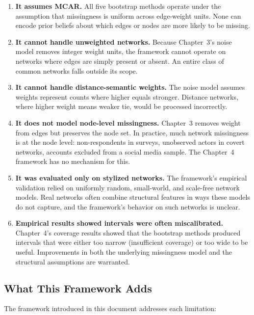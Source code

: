 \documentclass[11pt]{article}
\begin{document}
\begin{enumerate}[leftmargin=*, itemsep=2pt]
  \item \textbf{It assumes MCAR.} All five bootstrap methods operate under the assumption that missingness is uniform across edge-weight units. None can encode prior beliefs about which edges or nodes are more likely to be missing.

  \item \textbf{It cannot handle unweighted networks.} Because Chapter~3's noise model removes integer weight units, the framework cannot operate on networks where edges are simply present or absent. An entire class of common networks falls outside its scope.

  \item \textbf{It cannot handle distance-semantic weights.} The noise model assumes weights represent counts where higher equals stronger. Distance networks, where higher weight means weaker tie, would be processed incorrectly.

  \item \textbf{It does not model node-level missingness.} Chapter~3 removes weight from edges but preserves the node set. In practice, much network missingness is at the node level: non-respondents in surveys, unobserved actors in covert networks, accounts excluded from a social media sample. The Chapter~4 framework has no mechanism for this.

  \item \textbf{It was evaluated only on stylized networks.} The framework's empirical validation relied on uniformly random, small-world, and scale-free network models. Real networks often combine structural features in ways these models do not capture, and the framework's behavior on such networks is unclear.

  \item \textbf{Empirical results showed intervals were often miscalibrated.} Chapter~4's coverage results showed that the bootstrap methods produced intervals that were either too narrow (insufficient coverage) or too wide to be useful. Improvements in both the underlying missingness model and the structural assumptions are warranted.
\end{enumerate}

\subsection{What This Framework Adds}

The framework introduced in this document addresses each limitation:
\end{document}
